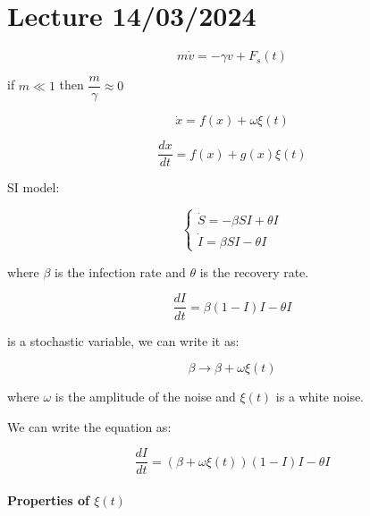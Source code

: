 \newpage
\chapter{Lecture 14/03/2024}

$$
m \dot v = - \gamma v + F_s(t)
$$

if $m \ll 1$ then $\dfrac m \gamma \approx 0$



$$
\dot x = f(x) + \omega \xi(t)
$$

$$
\dfrac {dx}{dt} = f(x) + g(x) \xi(t)
$$

SI model:

$$
\begin{cases}
    \dot S = - \beta S I + \theta I\\
    \dot I = \beta S I - \theta I
\end{cases}
$$

where $\beta$ is the infection rate and $\theta$ is the recovery rate.

$$
\dfrac {dI}{dt} = \beta(1-I)I - \theta I
$$

\beta is a stochastic variable, we can write it as:

$$
\beta \rightarrow \beta + \omega \xi(t)
$$

where $\omega$ is the amplitude of the noise and $\xi(t)$ is a white noise.

We can write the equation as:

$$
\dfrac {dI}{dt} = (\beta + \omega \xi(t))(1-I)I - \theta I
$$

\subsubsection{Properties of $\xi(t)$}

